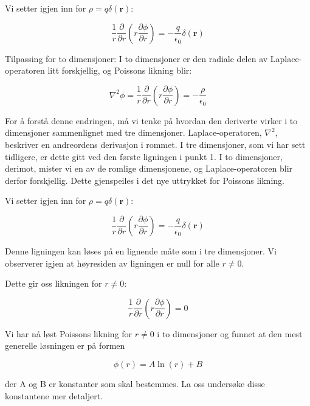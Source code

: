 Vi setter igjen inn for $\rho = q \delta(\mathbf{r})$:

\begin{equation*}
\frac{1}{r} \frac{\partial}{\partial r} \left(r \frac{\partial \phi}{\partial r}\right) = - \frac{q}{\epsilon_0} \delta(\mathbf{r})
\end{equation*}

Tilpassing for to dimensjoner: I to dimensjoner er den radiale delen av Laplace-operatoren litt forskjellig, og Poissons likning blir:

\begin{equation*}
\nabla^2 \phi = \frac{1}{r} \frac{\partial}{\partial r} \left(r \frac{\partial \phi}{\partial r}\right) = - \frac{\rho}{\epsilon_0}
\end{equation*}

For å forstå denne endringen, må vi tenke på hvordan den deriverte virker i to dimensjoner sammenlignet med tre dimensjoner. Laplace-operatoren, $\nabla^2$, beskriver en andreordens derivasjon i rommet. I tre dimensjoner, som vi har sett tidligere, er dette gitt ved den første ligningen i punkt 1. I to dimensjoner, derimot, mister vi en av de romlige dimensjonene, og Laplace-operatoren blir derfor forskjellig. Dette gjenspeiles i det nye uttrykket for Poissons likning.

Vi setter igjen inn for $\rho = q \delta(\mathbf{r})$:

\begin{equation*}
\frac{1}{r} \frac{\partial}{\partial r} \left(r \frac{\partial \phi}{\partial r}\right) = - \frac{q}{\epsilon_0} \delta(\mathbf{r})
\end{equation*}

Denne ligningen kan løses på en lignende måte som i tre dimensjoner. Vi observerer igjen at høyresiden av ligningen er null for alle $r \neq 0$.

Dette gir oss likningen for $r \neq 0$:

\begin{equation*}
\frac{1}{r} \frac{\partial}{\partial r} \left(r \frac{\partial \phi}{\partial r}\right) = 0
\end{equation*}

Vi har nå løst Poissons likning for $r \neq 0$ i to dimensjoner og funnet at den mest generelle løsningen er på formen

\begin{equation}
\phi(r) = A \ln(r) + B
\end{equation}

der A og B er konstanter som skal bestemmes. La oss undersøke disse konstantene mer detaljert.


